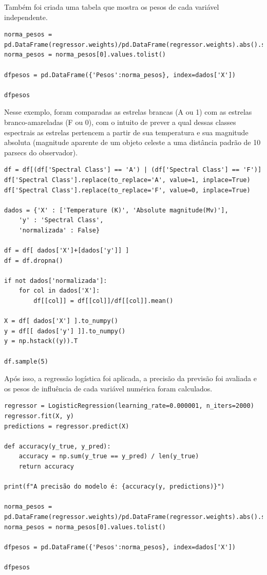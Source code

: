 \documentclass[12pt]{article}
\begin{document}
\vspace{120pt}
Também foi criada uma tabela que mostra os pesos de cada variável independente.\\

\begin{lstlisting}
norma_pesos = pd.DataFrame(regressor.weights)/pd.DataFrame(regressor.weights).abs().sum()
norma_pesos = norma_pesos[0].values.tolist()

dfpesos = pd.DataFrame({'Pesos':norma_pesos}, index=dados['X'])

dfpesos
\end{lstlisting}

Nesse exemplo, foram comparadas as estrelas brancas (A ou 1) com as estrelas branco-amareladas (F ou 0), com o intuito de prever a qual dessas classes espectrais as estrelas pertencem a partir de sua temperatura e sua magnitude absoluta (magnitude aparente de um objeto celeste a uma distância padrão de 10 parsecs do observador).\\

\begin{lstlisting}
df = df[(df['Spectral Class'] == 'A') | (df['Spectral Class'] == 'F')]
df['Spectral Class'].replace(to_replace='A', value=1, inplace=True)
df['Spectral Class'].replace(to_replace='F', value=0, inplace=True)

dados = {'X' : ['Temperature (K)', 'Absolute magnitude(Mv)'],
    'y' : 'Spectral Class',
    'normalizada' : False}

df = df[ dados['X']+[dados['y']] ]
df = df.dropna()

if not dados['normalizada']:
    for col in dados['X']:
        df[[col]] = df[[col]]/df[[col]].mean()

X = df[ dados['X'] ].to_numpy()
y = df[[ dados['y'] ]].to_numpy()
y = np.hstack((y)).T

df.sample(5)
\end{lstlisting}

Após isso, a regressão logística foi aplicada, a precisão da previsão foi avaliada e os pesos de influência de cada variável numérica foram calculados.
\\
\begin{lstlisting}
regressor = LogisticRegression(learning_rate=0.000001, n_iters=2000)
regressor.fit(X, y)
predictions = regressor.predict(X)

def accuracy(y_true, y_pred):
    accuracy = np.sum(y_true == y_pred) / len(y_true)
    return accuracy

print(f"A precisão do modelo é: {accuracy(y, predictions)}")

norma_pesos = pd.DataFrame(regressor.weights)/pd.DataFrame(regressor.weights).abs().sum()
norma_pesos = norma_pesos[0].values.tolist()

dfpesos = pd.DataFrame({'Pesos':norma_pesos}, index=dados['X'])

dfpesos
\end{lstlisting}
\end{document}
